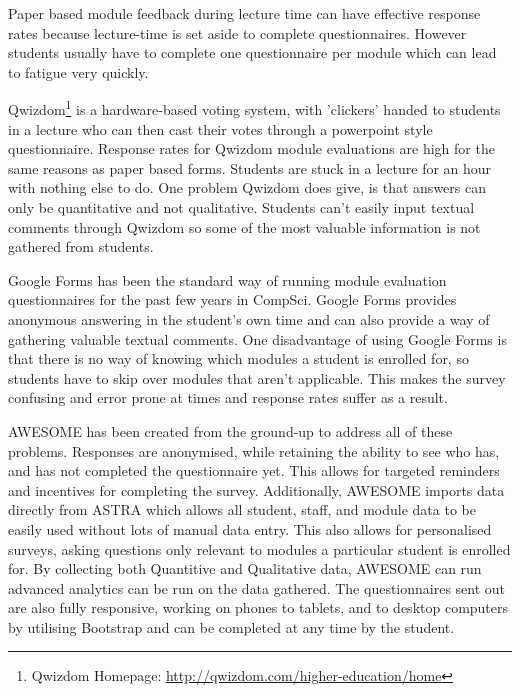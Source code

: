 	Paper based module feedback during lecture time can have effective response rates because lecture-time is set aside to complete questionnaires.
	However students usually have to complete one questionnaire per module which can lead to fatigue very quickly.
	
	\newpage

	Qwizdom\footnote{Qwizdom Homepage: \url{http://qwizdom.com/higher-education/home}} is a hardware-based voting system, with 'clickers' handed to students in a lecture who can then cast their votes through a powerpoint style questionnaire.
	Response rates for Qwizdom module evaluations are high for the same reasons as paper based forms.
	Students are stuck in a lecture for an hour with nothing else to do.
	One problem Qwizdom does give, is that answers can only be quantitative and not qualitative.
	Students can't easily input textual comments through Qwizdom so some of the most valuable information is not gathered from students.

	Google Forms has been the standard way of running module evaluation questionnaires for the past few years in CompSci.
	Google Forms provides anonymous answering in the student's own time and can also provide a way of gathering valuable textual comments.
	One disadvantage of using Google Forms is that there is no way of knowing which modules a student is enrolled for, so students have to skip over modules that aren't applicable.
	This makes the survey confusing and error prone at times and response rates suffer as a result.
		
	\ac{AWESOME} has been created from the ground-up to address all of these problems.
	Responses are anonymised, while retaining the ability to see who has, and has not completed the questionnaire yet.
	This allows for targeted reminders and incentives for completing the survey.
	Additionally, \ac{AWESOME} imports data directly from \ac{ASTRA} which allows all student, staff, and module data to be easily used without lots of manual data entry.
	This also allows for personalised surveys, asking questions only relevant to modules a particular student is enrolled for.
	By collecting both Quantitive and Qualitative data, \ac{AWESOME} can run advanced analytics can be run on the data gathered.
	The questionnaires sent out are also fully responsive, working on phones to tablets, and to desktop computers by utilising Bootstrap and can be completed at any time by the student.
	
